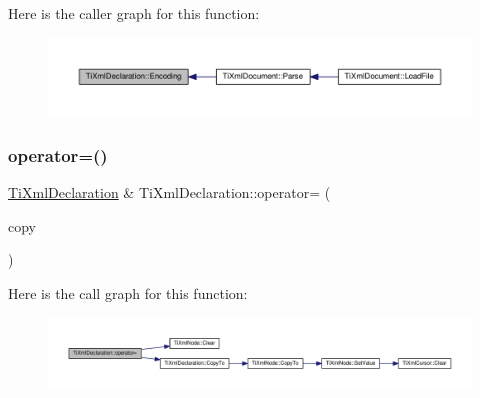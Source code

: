 Here is the caller graph for this function\+:\nopagebreak
\begin{figure}[H]
\begin{center}
\leavevmode
\includegraphics[width=350pt]{class_ti_xml_declaration_a8d3d1b5b226daa8353276d719497be80_icgraph}
\end{center}
\end{figure}
\mbox{\label{class_ti_xml_declaration_a3bc617efe11014ff2b1a9c5727c37a9a}} 
\subsubsection{\texorpdfstring{operator=()}{operator=()}}
{\footnotesize\ttfamily \hyperlink{class_ti_xml_declaration}{Ti\+Xml\+Declaration} \& Ti\+Xml\+Declaration\+::operator= (\begin{DoxyParamCaption}\item[{const \hyperlink{class_ti_xml_declaration}{Ti\+Xml\+Declaration} \&}]{copy }\end{DoxyParamCaption})}

Here is the call graph for this function\+:\nopagebreak
\begin{figure}[H]
\begin{center}
\leavevmode
\includegraphics[width=350pt]{class_ti_xml_declaration_a3bc617efe11014ff2b1a9c5727c37a9a_cgraph}
\end{center}
\end{figure}
\mbox{\label{class_ti_xml_declaration_a9839ea97ed687a2b7342fd7b0f04361b}} 
